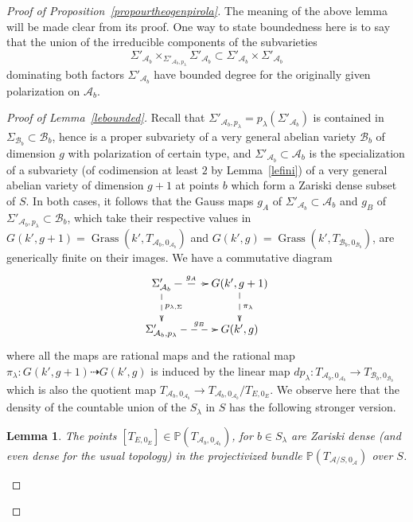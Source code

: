 \documentclass[11pt]{article}
\newtheorem{lemm}[theo]{Lemma}
\theoremstyle{definition}
\numberwithin{equation}{section}
\numberwithin{figure}{section}
\numberwithin{table}{section}
\DeclareMathOperator{\Grass}{Grass}
\begin{document}
\begin{proof}[Proof of Proposition~\ref{propourtheogenpirola}]
The meaning of the above lemma will be made clear from its proof. One way to state boundedness here is to say that the union of the irreducible components of the subvarieties
\[
\Sigma'_{\mathcal{A}_b}\times_{\Sigma'_{\mathcal{A}_b,p_\lambda}}\Sigma'_{\mathcal{A}_b}\subset
\Sigma'_{\mathcal{A}_b}\times\Sigma'_{\mathcal{A}_b}
\]
dominating both factors $\Sigma'_{\mathcal{A}_b}$ have bounded degree for the originally given polarization on $\mathcal{A}_b$.

\begin{proof}[Proof of Lemma~\ref{lebounded}]
Recall that $\Sigma'_{\mathcal{A}_b,p_\lambda}=p_\lambda(\Sigma'_{\mathcal{A}_b})$ is contained in $ \Sigma_{\mathcal{B}_b}\subset \mathcal{B}_b$, hence is a proper subvariety of a very general abelian variety $\mathcal{B}_b$ of dimension $g$ with polarization of certain type, and $\Sigma'_{\mathcal{A}_b}\subset \mathcal{A}_b$ is the specialization of a subvariety (of codimension at least $2$ by Lemma~\ref{lefini}) of a very general abelian variety of dimension $g+1$ at points $b$ which form a Zariski dense subset of $S$. In both cases, it follows that the Gauss maps $g_A$ of $\Sigma'_{\mathcal{A}_b}\subset \mathcal{A}_b$ and $g_B$ of $\Sigma'_{\mathcal{A}_b,p_\lambda}\subset \mathcal{B}_b$, which take their respective values in $G(k',g+1)=\Grass(k',T_{\mathcal{A}_b,0_{\mathcal{A}_b}})$ and $G(k',g)=\Grass(k',T_{\mathcal{B}_b,0_{\mathcal{B}_b}})$, are generically finite on their images. We have a commutative diagram
\begin{equation}\label{numerodiag}
\begin{aligned}
\xymatrix{ \Sigma'_{\mathcal{A}_b}\ar@{-->}[r]^-{g_A}\ar@{-->}[d]^{p_{\lambda,\Sigma}} &G(k',g+1)\ar@{-->}[d]^{\pi_\lambda}\\
\Sigma'_{\mathcal{A}_b,p_\lambda}\ar@{-->}[r]^-{g_B} &G(k',g) }
\end{aligned}
\end{equation}
where all the maps are rational maps and the rational map $\pi_\lambda:G(k',g+1)\dashrightarrow G(k',g)$ is induced by the linear map $dp_\lambda: T_{\mathcal{A}_b,0_{\mathcal{A}_b}}\rightarrow T_{\mathcal{B}_b,0_{\mathcal{B}_b}}$ which is also the quotient map $T_{\mathcal{A}_b,0_{\mathcal{A}_b}}\rightarrow T_{\mathcal{A}_b,0_{\mathcal{A}_b}}/T_{E,0_E}$. We observe here that the density of the countable union of the $S_\lambda$ in $S$ has the following stronger version.

\begin{lemm}\label{ledensetEisog}
The points $[T_{E,0_E}]\in \mathbb{P}(T_{\mathcal{A}_b,0_{\mathcal{A}_b}})$, for $b\in S_\lambda$ are Zariski dense (and even dense for the usual topology) in the projectivized bundle $\mathbb{P}(T_{\mathcal{A}/S,0_{\mathcal{A}}})$ over $S$.
\end{lemm}


\end{proof}
\end{proof}
\end{document}

